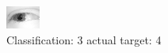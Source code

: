 \begin{figure}[h!]
\begin{center}
\includegraphics[width=0.60\columnwidth]{figures/ID2401_class_3_target_4.png}
\end{center}
\caption{ Classification: 3 actual target: 4}
\label{fig:ID2401_class_3_target_4}
\end{figure}
